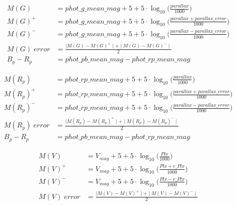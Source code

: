 \documentclass{article}
\begin{document}
\newpage

\begin{equation*}
	\begin{aligned}
		M(G) &= phot\_g\_mean\_mag + 5 + 5 \cdot \log_{10}\bigg(\frac{parallax}{1000}\bigg)\\[15pt]
		M(G)^{+} &= phot\_g\_mean\_mag + 5 + 5 \cdot \log_{10}\bigg(\frac{parallax + parallax\_error}{1000}\bigg)\\[15pt]
		M(G)^{-} &= phot\_g\_mean\_mag + 5 + 5 \cdot \log_{10}\bigg(\frac{parallax - parallax\_error}{1000}\bigg)\\[15pt]
		M(G) \; error & = \frac{\mid M(G) - M(G)^{+} \mid + \mid M(G) - M(G)^{-} \mid}{2}\\[15pt]
		B_p - R_p & = phot\_pb\_mean\_mag - phot\_rp\_mean\_mag
	\end{aligned}
\end{equation*}

\vspace{50pt}

\begin{equation*}
	\begin{aligned}
		M(R_p) &= phot\_rp\_mean\_mag + 5 + 5 \cdot \log_{10}\bigg(\frac{parallax}{1000}\bigg)\\[15pt]
		M(R_p)^{+} &= phot\_rp\_mean\_mag + 5 + 5 \cdot \log_{10}\bigg(\frac{parallax + parallax\_error}{1000}\bigg)\\[15pt]
		M(R_p)^{-} &= phot\_rp\_mean\_mag + 5 + 5 \cdot \log_{10}\bigg(\frac{parallax - parallax\_error}{1000}\bigg)\\[15pt]
		M(R_p) \; error & = \frac{\mid M(R_p) - M(R_p)^{+} \mid + \mid M(R_p) - M(R_p)^{-} \mid}{2}\\[15pt]
		B_p - R_p & = phot\_pb\_mean\_mag - phot\_rp\_mean\_mag
	\end{aligned}
\end{equation*}

\newpage

\begin{equation*}
	\begin{aligned}
		M(V) &= V_{mag} + 5 + 5 \cdot \log_{10}\bigg(\frac{Plx}{1000}\bigg)\\[15pt]
		M(V)^{+} &= V_{mag} + 5 + 5 \cdot \log_{10}\bigg(\frac{Plx + e\_Plx}{1000}\bigg)\\[15pt]
		M(V)^{-} &= V_{mag} + 5 + 5 \cdot \log_{10}\bigg(\frac{Plx - e\_Plx}{1000}\bigg)\\[15pt]
		M(V) \; error & = \frac{\mid M(V) - M(V)^{+} \mid + \mid M(V) - M(V)^{-} \mid}{2}\\[15pt]
	\end{aligned}
\end{equation*}
\end{document}
